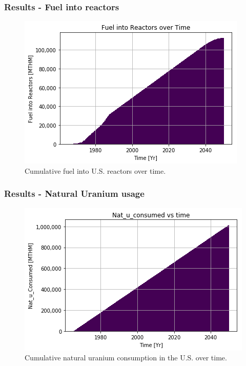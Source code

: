 \begin{frame}
    \frametitle{Results - Fuel into reactors}
    \begin{figure}[htbp!]
        \begin{center}
                \includegraphics[width=.8\textwidth]{./images/sim_output/us/fuel.png}
        \end{center}
    \caption{Cumulative fuel into U.S. reactors over time.}
    \end{figure}
\end{frame}


\begin{frame}
    \frametitle{Results - Natural Uranium usage}
    \begin{figure}[htbp!]
        \begin{center}
                \includegraphics[width=.8\textwidth]{./images/sim_output/us/natu.png}
        \end{center}
    \caption{Cumulative natural uranium consumption in the U.S. over time.}
    \end{figure}
\end{frame}

